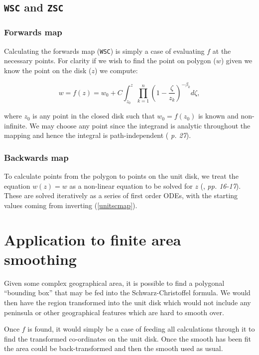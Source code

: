 \documentclass[a4paper,10pt]{amsart}
\newcommand{\sch}{Schwarz-Christoffel }
\begin{document}
\subsection{\texttt{WSC} and \texttt{ZSC}}

\subsubsection{Forwards map}

Calculating the forwards map (\texttt{WSC}) is simply a case of evaluating $f$ at the necessary points. For clarity if we wish to find the point on polygon ($w$) given we know the point on the disk ($z$) we compute:

\begin{equation}
\label{unitscmap}
w=f(z) = w_0 + C \int_{z_0}^{z} \prod_{k=1}^{n} (1 - \frac{\zeta}{z_k})^{-\beta_k} d\zeta,
\end{equation}

where $z_0$ is any point in the closed disk such that $w_0 = f(z_0)$ is known and non-infinite. We may choose any point since the integrand is analytic throughout the mapping and hence the integral is path-independent (\cite{driscoll} \emph{p. 27}).


\subsubsection{Backwards map}

To calculate points from the polygon to points on the unit disk, we treat the equation $w(z)=w$ as a non-linear equation to be solved for $z$ (\cite{trefethen}, \emph{pp. 16-17}). These are solved iteratively as a series of first order ODEs, with the starting values coming from inverting (\ref{unitscmap}).



\section{Application to finite area smoothing}

Given some complex geographical area, it is possible to find a polygonal ``bounding box'' that may be fed into the \sch formula. We would then have the region transformed into the  unit disk which would not include any peninsula or other geographical features which are hard to smooth over.

Once $f$ is found, it would simply be a case of feeding all calculations through it to find the transformed co-ordinates on the unit disk. Once the smooth has been fit the area could be back-transformed and then the smooth used as usual.









\end{document}
